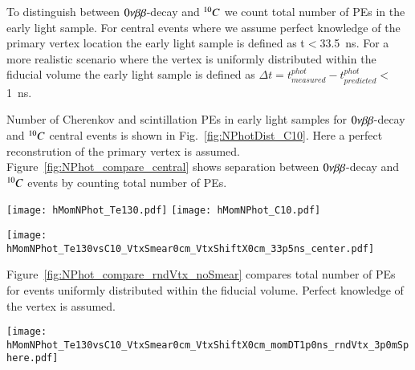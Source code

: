 To distinguish between $0\nu\beta\beta$-decay and $^{10}C$ we count total number of PEs in the 
early light sample. For central events where we assume perfect knowledge of the 
primary vertex location the early light sample is defined as t$<$33.5~ns. For a more 
realistic scenario where the vertex is uniformly distributed within the fiducial volume
the early light sample is defined as $\Delta t=t^{phot}_{measured} - 
t^{phot}_{predicted}<$1~ns.


Number of Cherenkov and scintillation PEs in early light samples for $0\nu\beta\beta$-decay and 
$^{10}C$ central events is shown in Fig.~\ref{fig:NPhotDist_C10}. Here a perfect 
reconstrution of the primary vertex is assumed. Figure~\ref{fig:NPhot_compare_central} shows
separation between $0\nu\beta\beta$-decay and $^{10}C$ events by counting total number of PEs. 

\begin{figure*}[ht]
  \centering
  \texttt{[image: hMomNPhot\_Te130.pdf]}
  \texttt{[image: hMomNPhot\_C10.pdf]}
  \caption{Early photons. Number of Cherenkov (\emph{dashed red line}), 
    scintillation
    (\emph{dotted blue line}), and total (\emph{solid black line}) PEs
    for the simulation of 1000 $^{130}$Te 0{\nbb} decay (left panel)
    and of 648 $^{10}$C (\emph{right panel}) events (1000 $^{10}$C events was 
    generated, but selected only those that has total energy deposition in the 
    detector in the range between 2.1 and 2.9~MeV).}
\label{fig:NPhotDist_C10}
\end{figure*}



\begin{figure*}[ht]
  \centering
  \texttt{[image: hMomNPhot\_Te130vsC10\_VtxSmear0cm\_VtxShiftX0cm\_33p5ns\_center.pdf]}
  \caption{Comparison of total number of early photons between $^{130}$Te 0{\nbb} decay 
    and $^{10}$C events with energy deposition in the range between 2.1 and 2.9~MeV. 
    Events originated at the center of the sphere.
    Perfect vertex reconstruction - true vertex position is used. Time cut of 
    33.5~ns on the photon arrival time is applied.}
\label{fig:NPhot_compare_central}
\end{figure*}


Figure~\ref{fig:NPhot_compare_rndVtx_noSmear} compares total number of PEs for events uniformly 
distributed within the fiducial volume. Perfect knowledge of the vertex is assumed.

\begin{figure*}[ht]
  \centering
  \texttt{[image: hMomNPhot\_Te130vsC10\_VtxSmear0cm\_VtxShiftX0cm\_momDT1p0ns\_rndVtx\_3p0mSphere.pdf]}
  \caption{Comparison of total number of early photons between $^{130}$Te 0{\nbb} decay
    and $^{10}$C events with energy deposition in the range between 2.1 and 2.9~MeV.
    Verticies are uniformly distributed within the fiducial volume, $R<3$~m.
    Perfect vertex reconstruction - true vertex position is used.}
\label{fig:NPhot_compare_rndVtx_noSmear}
\end{figure*}


